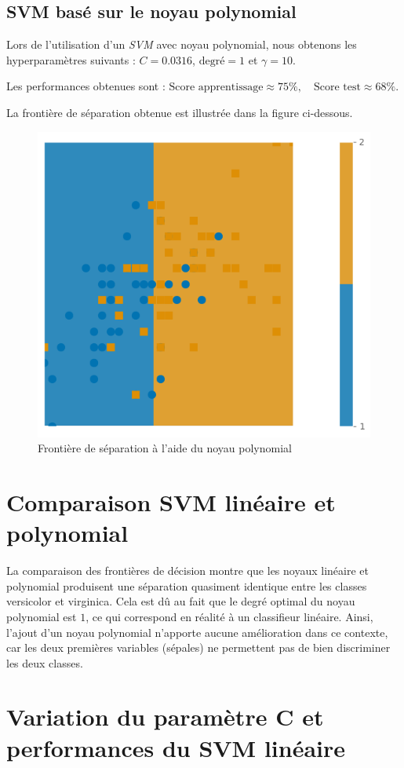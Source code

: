 \documentclass{rapport}
\begin{document}
\subsection{SVM basé sur le noyau polynomial}

Lors de l’utilisation d’un \textit{SVM} avec noyau polynomial, nous obtenons les hyperparamètres suivants : $C = 0.0316$, $\text{degré} = 1$ et $\gamma = 10$.

Les performances obtenues sont :
$\text{Score apprentissage} \approx 75\%, \quad
 \text{Score test} \approx 68\%.$

La frontière de séparation obtenue est illustrée dans la figure ci-dessous.




\begin{figure}[H]
    \centering
    \includegraphics[width=0.45\linewidth]{logos/frontiere.png}
    \caption{Frontière de séparation à l’aide du noyau polynomial}
    \label{fig:placeholdeer}
\end{figure}


\section{Comparaison SVM linéaire et polynomial}

La comparaison des frontières de décision montre que les noyaux linéaire et polynomial produisent une séparation quasiment identique entre les classes versicolor et virginica. Cela est dû au fait que le degré optimal du noyau polynomial est $1$, ce qui correspond en réalité à un classifieur linéaire. Ainsi, l’ajout d’un noyau polynomial n’apporte aucune amélioration dans ce contexte, car les deux premières variables (sépales) ne permettent pas de bien discriminer les deux classes.

\section{Variation du paramètre C et performances du SVM linéaire}
\end{document}
